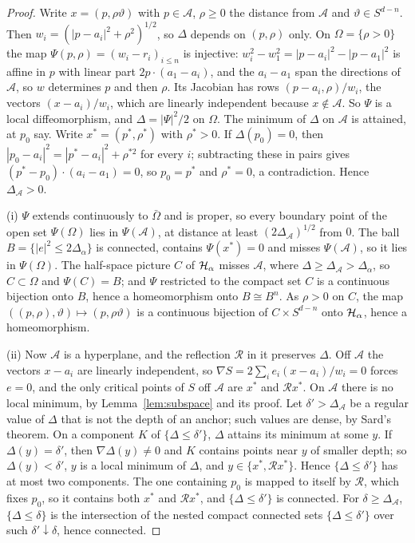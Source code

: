 \begin{proof}
Write $x = (p, \rho\vartheta)$ with $p \in \mathcal A$, $\rho \ge 0$ the distance from $\mathcal A$ and
$\vartheta \in S^{d-n}$. Then $w_i = (|p - a_i|^2 + \rho^2)^{1/2}$, so $\Delta$ depends on $(p, \rho)$ only. On
$\Omega = \{\rho > 0\}$ the map $\Psi(p, \rho) = (w_i - r_i)_{i \le n}$ is injective: $w_i^2 - w_1^2 =
|p - a_i|^2 - |p - a_1|^2$ is affine in $p$ with linear part $2p\cdot(a_1 - a_i)$, and the $a_i - a_1$ span the
directions of $\mathcal A$, so $w$ determines $p$ and then $\rho$. Its Jacobian has rows $(p - a_i, \rho)/w_i$, the
vectors $(x - a_i)/w_i$, which are linearly independent because $x \notin \mathcal A$. So $\Psi$ is a local
diffeomorphism, and $\Delta = |\Psi|^2/2$ on $\Omega$. The minimum of $\Delta$ on $\mathcal A$ is attained, at $p_0$
say. Write $x^* = (p^*, \rho^*)$ with $\rho^* > 0$. If $\Delta(p_0) = 0$, then
$|p_0 - a_i|^2 = |p^* - a_i|^2 + \rho^{*2}$ for every $i$; subtracting these in pairs gives
$(p^* - p_0)\cdot(a_i - a_1) = 0$, so $p_0 = p^*$ and $\rho^* = 0$, a contradiction. Hence $\Delta_{\mathcal A} > 0$.

(i) $\Psi$ extends continuously to $\bar\Omega$ and is proper, so every boundary point of the open set $\Psi(\Omega)$
lies in $\Psi(\mathcal A)$, at distance at least $(2\Delta_{\mathcal A})^{1/2}$ from $0$. The ball
$B = \{|e|^2 \le 2\Delta_\alpha\}$ is connected, contains $\Psi(x^*) = 0$ and misses $\Psi(\mathcal A)$, so it lies in
$\Psi(\Omega)$. The half-space picture $C$ of $\mathcal{H}_\alpha$ misses $\mathcal A$, where $\Delta \ge \Delta_{\mathcal A} > \Delta_\alpha$,
so $C \subset \Omega$ and $\Psi(C) = B$; and $\Psi$ restricted to the compact set $C$ is a continuous bijection onto $B$,
hence a homeomorphism onto $B \cong B^n$. As $\rho > 0$ on $C$, the map $((p, \rho), \vartheta) \mapsto (p, \rho\vartheta)$ is a
continuous bijection of $C \times S^{d-n}$ onto $\mathcal{H}_\alpha$, hence a homeomorphism.

(ii) Now $\mathcal A$ is a hyperplane, and the reflection $\mathcal R$ in it preserves $\Delta$. Off
$\mathcal A$ the vectors $x - a_i$ are linearly independent, so $\nabla S = 2\sum_i e_i(x - a_i)/w_i = 0$ forces $e = 0$, and the
only critical points of $S$ off $\mathcal A$ are $x^*$ and $\mathcal Rx^*$. On $\mathcal A$ there is no local
minimum, by Lemma~\ref{lem:subspace} and its proof. Let $\delta' > \Delta_{\mathcal A}$ be a regular value of $\Delta$
that is not the depth of an anchor; such values are dense, by Sard's theorem. On a component $K$ of
$\{\Delta \le \delta'\}$, $\Delta$ attains its minimum at some $y$. If $\Delta(y) = \delta'$, then $\nabla\Delta(y) \ne 0$
and $K$ contains points near $y$ of smaller depth; so $\Delta(y) < \delta'$, $y$ is a local minimum of $\Delta$, and
$y \in \{x^*, \mathcal Rx^*\}$. Hence $\{\Delta \le \delta'\}$ has at most two components. The one containing
$p_0$ is mapped to itself by $\mathcal R$, which fixes $p_0$, so it contains both $x^*$ and
$\mathcal Rx^*$, and $\{\Delta \le \delta'\}$ is connected. For $\delta \ge \Delta_{\mathcal A}$,
$\{\Delta \le \delta\}$ is the intersection of the nested compact connected sets $\{\Delta \le \delta'\}$ over such
$\delta' \downarrow \delta$, hence connected.
\end{proof}

